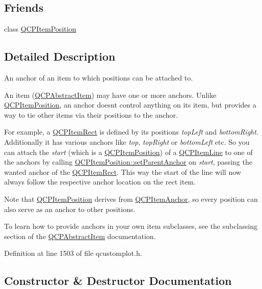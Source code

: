 \subsection*{Friends}
\begin{DoxyCompactItemize}
\item 
class \hyperlink{class_q_c_p_item_anchor_aa9b8ddc062778e202a0be06a57d18d17}{Q\+C\+P\+Item\+Position}
\end{DoxyCompactItemize}


\subsection{Detailed Description}
An anchor of an item to which positions can be attached to. 

An item (\hyperlink{class_q_c_p_abstract_item}{Q\+C\+P\+Abstract\+Item}) may have one or more anchors. Unlike \hyperlink{class_q_c_p_item_position}{Q\+C\+P\+Item\+Position}, an anchor doesn\textquotesingle{}t control anything on its item, but provides a way to tie other items via their positions to the anchor.

For example, a \hyperlink{class_q_c_p_item_rect}{Q\+C\+P\+Item\+Rect} is defined by its positions {\itshape top\+Left} and {\itshape bottom\+Right}. Additionally it has various anchors like {\itshape top}, {\itshape top\+Right} or {\itshape bottom\+Left} etc. So you can attach the {\itshape start} (which is a \hyperlink{class_q_c_p_item_position}{Q\+C\+P\+Item\+Position}) of a \hyperlink{class_q_c_p_item_line}{Q\+C\+P\+Item\+Line} to one of the anchors by calling \hyperlink{class_q_c_p_item_position_ac094d67a95d2dceafa0d50b9db3a7e51}{Q\+C\+P\+Item\+Position\+::set\+Parent\+Anchor} on {\itshape start}, passing the wanted anchor of the \hyperlink{class_q_c_p_item_rect}{Q\+C\+P\+Item\+Rect}. This way the start of the line will now always follow the respective anchor location on the rect item.

Note that \hyperlink{class_q_c_p_item_position}{Q\+C\+P\+Item\+Position} derives from \hyperlink{class_q_c_p_item_anchor}{Q\+C\+P\+Item\+Anchor}, so every position can also serve as an anchor to other positions.

To learn how to provide anchors in your own item subclasses, see the subclassing section of the \hyperlink{class_q_c_p_abstract_item}{Q\+C\+P\+Abstract\+Item} documentation. 

Definition at line 1503 of file qcustomplot.\+h.



\subsection{Constructor \& Destructor Documentation}
\hypertarget{class_q_c_p_item_anchor_aeb6b681d2bf324db40a915d32ec5624f}{}
